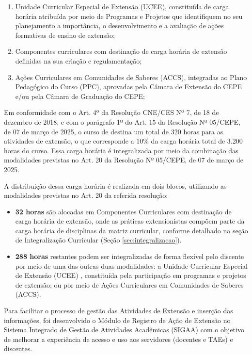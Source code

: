 \begin{enumerate}[label=\Roman* --, leftmargin=*]
    \item Unidade Curricular Especial de Extensão (UCEE), constituída de carga horária atribuída por meio de Programas e Projetos que identifiquem no seu planejamento a importância, o desenvolvimento e a avaliação de ações formativas de ensino de extensão; 
    \item Componentes curriculares com destinação de carga horária de extensão definidas na sua criação e regulamentação; 
    \item Ações Curriculares em Comunidades de Saberes (ACCS), integradas ao Plano Pedagógico do Curso (PPC), aprovadas pela Câmara de Extensão do CEPE e/ou pela Câmara de Graduação do CEPE; 
\end{enumerate}

Em conformidade com o Art. 4º da Resolução CNE/CES Nº 7, de 18 de dezembro de 2018, e com o parágrafo 1º do Art. 15 da Resolução Nº 05/CEPE, de 07 de março de 2025, o curso de \nomedocurso destina um total de 320 horas para as atividades de extensão, o que corresponde a 10\% da carga horária total de 3.200 horas do curso. Essa carga horária é integralizada por meio da combinação das modalidades previstas no Art. 20 da Resolução Nº 05/CEPE, de 07 de março de 2025.

A distribuição dessa carga horária é realizada em dois blocos, utilizando as modalidades previstas no Art. 20 da referida resolução:

\begin{itemize}
    \item \textbf{32 horas} são alocadas em Componentes Curriculares com destinação de carga horária de extensão, onde as práticas extensionistas compõem parte da carga horária de disciplinas da matriz curricular, conforme detalhado na seção de Integralização Curricular (Seção \ref{sec:integralizacao}).
    \item \textbf{288 horas} restantes podem ser integralizadas de forma flexível pelo discente por meio de uma das outras duas modalidades: a Unidade Curricular Especial de Extensão (UCEE) , constituída pela participação em programas e projetos de extensão; ou por meio de Ações Curriculares em Comunidades de Saberes (ACCS).
\end{itemize}

Para facilitar o processo de gestão das Atividades de Extensão e inserção das informações, foi desenvolvido o Módulo de Registro de Ação de Extensão no Sistema Integrado de Gestão de Atividades Acadêmicas (SIGAA) com o objetivo de melhorar a experiência de acesso e uso aos servidores (docentes e TAEs) e discentes.

